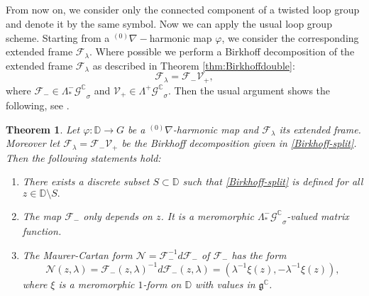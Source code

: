 \documentclass[12pt]{amsart}
\newtheorem{Theorem}{Theorem}[section]
\theoremstyle{definition}
\theoremstyle{remark}
\numberwithin{equation}{section}
\begin{document}
\subsection{}
 From now on, we consider only the connected component of 
 a twisted loop group and denote it by the same symbol.
 Now we can apply the usual loop group scheme. 
 Starting from a ${{}^{(0)}\nabla}-$harmonic map $\varphi$, we consider the corresponding 
 extended frame ${\mathcal F}_\lambda$.
 Where possible we perform a Birkhoff decomposition of the extended frame ${\mathcal F}_\lambda$ 
 as described in Theorem \ref{thm:Birkhoffdouble}:
\begin{equation}\label{Birkhoff-split}
 {\mathcal F}_\lambda = {\mathcal F}_{-} {\mathcal V}_{+}, 
\end{equation}
 where ${\mathcal F}_{-} \in {\Lambda^{-}_{*} {\mathcal G}^{\mathbb C}}_{\sigma}$ and ${\mathcal V}_{+} \in {\Lambda^{+} {\mathcal G}^{\mathbb C}}_{\sigma}$.
 Then the usual argument shows the following, see \cite{DPW}.
\begin{Theorem}\label{thm:Normalizedpot}
 Let $\varphi: {\mathbb D} \rightarrow G$ be a ${{}^{(0)}\nabla}$-harmonic map and 
 ${\mathcal F}_\lambda$ its extended frame. 
 Moreover let ${\mathcal F}_\lambda = {\mathcal F}_{-} {\mathcal V}_{+}$
 be the Birkhoff decomposition given in \eqref{Birkhoff-split}.
 Then the following statements hold{\rm :}
\begin{enumerate}
\item There exists a discrete subset $S \subset {\mathbb D}$ such that 
 \eqref{Birkhoff-split} is defined for all $z \in {\mathbb D} \setminus S.$

\item The map ${\mathcal F}_{-}$ only depends on $z$. It is a meromorphic 
${\Lambda^{-}_{*} {\mathcal G}^{\mathbb C}}_{\sigma}$-valued matrix function. 

\item The Maurer-Cartan form ${\mathcal N} = {\mathcal F}_{-}^{-1} d {\mathcal F}_{-}$ of ${\mathcal F}_-$
 has the form
 \begin{equation}\label{eq:normalizedpot}
 {\mathcal N}(z, {\lambda}) = {\mathcal F}_{-}(z, {\lambda})^{-1} d {\mathcal F}_{-}(z, {\lambda})= 
 \left({\lambda}^{-1}\xi(z),  -{\lambda}^{-1}\xi(z)\right),
 \end{equation}
 where $\xi$ is a meromorphic $1$-form on ${\mathbb D}$ with values in 
 $\mathfrak g^{\mathbb C}$.
\end{enumerate}
\end{Theorem}
\end{document}
